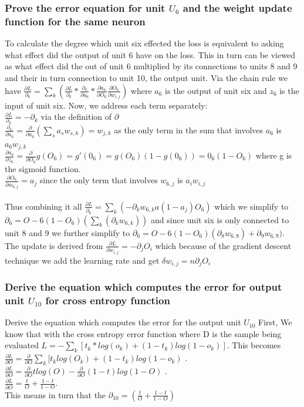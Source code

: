 \documentclass[11pt]{article}
\begin{document}
\subsubsection{Prove the error equation for unit $U_6$ and the weight update function for the same neuron}
To calculate the degree which unit six effected the loss is equivalent to asking what effect did the output of unit 6 have on the loss. This in turn can be viewed as what effect did the out of unit 6 multiplied by its connections to units 8 and 9 and their in turn connection to unit 10, the output unit. Via the chain rule we have $\frac{\partial L}{\partial_6} = \sum_k (\frac{\partial L}{\partial_k} * \frac{\partial_k}{\partial a_6} * \frac{\partial a_6}{\partial O_6} \frac{\partial O_6}{\partial w_{i,j}})$ where $a_6$ is the output of unit six and $z_6$ is the input of unit six. Now, we address each term separately: \\
$\frac{\partial L}{\partial_k} = - \partial_k$ via the definition of $\partial$ \\
$\frac{\partial_k}{\partial a_6} = \frac{\partial}{\partial a_6} (\sum_s a_s w_{s,k}) = w_{j,k}$ as the only term in the sum that involves $a_6$ is $a_6 w_{j,k}$\\
$\frac{\partial a_6}{\partial z_6} = \frac{\partial}{\partial O_6} g(O_6)= g'(0_6) = g(O_6)(1-g(0_6)) = 0_6(1-O_6)$ where g is the sigmoid function.\\
$\frac{\partial O_6}{\partial w_{6,j}} = a_j$ since the only term that involves $w_{6,j}$ is $a_i w_{i,j}$ \\ \\
Thus combining it all $\frac{\partial L}{\partial_6} = \sum_k (-\partial_k w_{6,k} a(1-a_j) O_6)$
which we simplify to $\partial_6 = O-6(1-O_6)(\sum_k (\partial_k w_{6,k}))$ and since unit six is only connected to unit 8 and 9 we further simplify to $\partial_6 = O-6(1-O_6)(\partial_8 w_{6,8}) + \partial_9 w_{6,9})$. \\ 
The update is derived from $\frac{\partial L}{\partial w_{i,j}} = -\partial_j O_i$ which because of the gradient descent technique we add  the learning rate and get $\delta w_{i,j} = n \partial_j O_i$
\subsubsection{Derive the equation which computes the error for output unit $U_10$ for cross entropy function}
Derive the equation which computes the error for the output unit $U_10$ 
First, We know that with the cross entropy error function where D is the sample being evaluated $L= -\sum_k [t_k *log(o_k) + (1-t_k)log(1-o_k)]$. This becomes \\
$\frac{\partial L}{\partial O} = \frac{\partial}{\partial O} \sum_k [t_k log(O_k) + (1-t_k)log(1-o_k)$ . \\
$\frac{\partial L}{\partial O} = \frac{\partial}{\partial O} t log(O) - \frac{\partial}{\partial O} (1-t)log(1-O)$ . \\
$\frac{\partial L}{\partial O} = \frac{t}{O} + \frac{1-t}{1-O}$. \\
This means in turn that the $\partial_{10} = (\frac{t}{O} + \frac{1-t}{1-O})$
\end{document}
